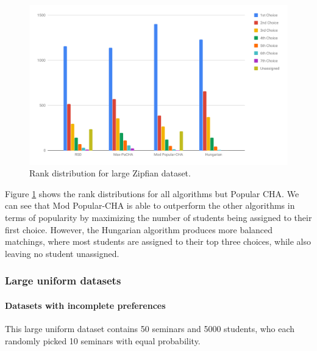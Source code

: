 \begin{figure}[h!]
  \centering
    \includegraphics[width=0.9\linewidth]{assets/plots/zipfian-medium.pdf}
    \caption{Rank distribution for large Zipfian dataset.}
    \label{fig:zipfian-medium-distribution}
\end{figure}

Figure \ref{fig:zipfian-medium-distribution} shows the rank distributions for all algorithms but Popular CHA. We can see that Mod Popular-CHA is able to outperform the other algorithms in terms of popularity by maximizing the number of students being assigned to their first choice. However, the Hungarian algorithm produces more balanced matchings, where most students are assigned to their top three choices, while also leaving no student unassigned.

\subsubsection{Large uniform datasets}

\paragraph{Datasets with incomplete preferences}
This large uniform dataset contains 50 seminars and 5000 students, who each randomly picked 10 seminars with equal probability.  

